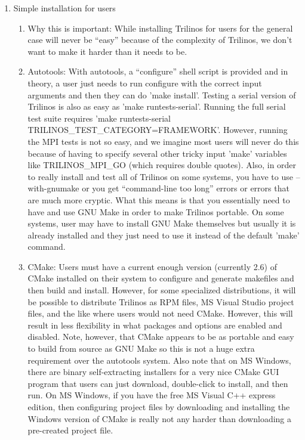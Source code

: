 \documentclass[pdf,ps2pdf,11pt]{SANDreport}
\begin{document}
\begin{enumerate}
\begin{enumerate}
  \end{enumerate}

{}\item Simple installation for users

  \begin{enumerate}

  {}\item Why this is important: While installing Trilinos for users
  for the general case will never be ``easy'' because of the
  complexity of Trilinos, we don't want to make it harder than it
  needs to be.

  {}\item Autotools: With autotools, a ``configure'' shell script is
  provided and in theory, a user just needs to run configure with the
  correct input arguments and then they can do 'make install'.
  Testing a serial version of Trilinos is also as easy as 'make
  runtests-serial'.  Running the full serial test suite requires 'make
  runtests-serial TRILINOS\_TEST\_CATEGORY=FRAMEWORK'.  However,
  running the MPI tests is not so easy, and we imagine most users will
  never do this because of having to specify several other tricky
  input 'make' variables like TRILINOS\_MPI\_GO (which requires double
  quotes).  Also, in order to really install and test all of Trilinos
  on some systems, you have to use --with-gnumake or you get
  ``command-line too long'' errors or errors that are much more
  cryptic.  What this means is that you essentially need to have and
  use GNU Make in order to make Trilinos portable.  On some systems,
  user may have to install GNU Make themselves but usually it is
  already installed and they just need to use it instead of the
  default 'make' command.

  {}\item CMake: Users must have a current enough version (currently
  2.6) of CMake installed on their system to configure and generate
  makefiles and then build and install.  However, for some specialized
  distributions, it will be possible to distribute Trilinos as RPM
  files, MS Visual Studio project files, and the like where users
  would not need CMake.  However, this will result in less flexibility
  in what packages and options are enabled and disabled.  Note,
  however, that CMake appears to be as portable and easy to build from
  source as GNU Make so this is not a huge extra requirement over the
  autotools system.  Also note that on MS Windows, there are binary
  self-extracting installers for a very nice CMake GUI program that
  users can just download, double-click to install, and then run.  On
  MS Windows, if you have the free MS Visual C++ express edition, then
  configuring project files by downloading and installing the Windows
  version of CMake is really not any harder than downloading a
  pre-created project file.


\end{enumerate}
\end{enumerate}
\end{document}
